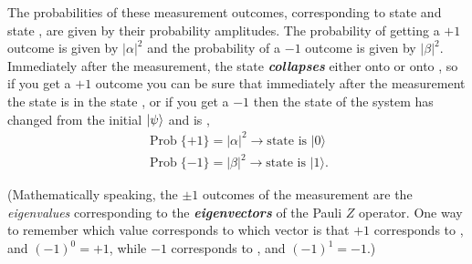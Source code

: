 The probabilities of these measurement outcomes, corresponding to state  and state , are given by their probability amplitudes. The probability of getting a $+1$ outcome is given by $|\alpha|^2$ and the probability of a $-1$ outcome is given by $|\beta|^2$. Immediately after the measurement, the state \textbf{\emph{collapses}} either onto  or onto , so if you get a $+1$ outcome you can be sure that immediately after the measurement the state is in the state , or if you get a $-1$ then the state of the system has changed from the initial $\left| \psi \right\rangle$ and is ,
\begin{align}
\operatorname{Prob}\{+1\}=|\alpha|^2 \rightarrow \textrm{state is } |0\rangle \\
\operatorname{Prob}\{-1\}=|\beta|^2 \rightarrow \textrm{state is } |1\rangle.
\end{align}

(Mathematically speaking, the $\pm 1$ outcomes of the measurement are the \emph{eigenvalues} corresponding to the \textbf{\emph{eigenvectors}} of the Pauli $Z$ operator.  One way to remember which value corresponds to which vector is that $+1$ corresponds to , and $(-1)^0 = +1$, while $-1$ corresponds to , and $(-1)^1 = -1$.)

